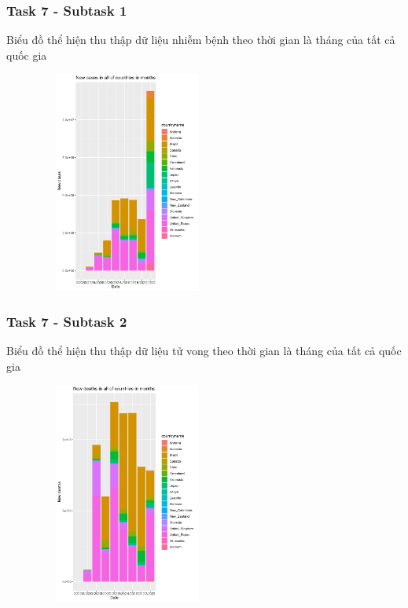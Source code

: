 \documentclass[english,10pt,table]{beamer}
\begin{document}
\frame
{
    \frametitle{Task 7 - Subtask 1}
    \begin{block}{Biểu đồ thể hiện thu thập dữ liệu nhiễm bệnh theo thời gian là tháng của tất cả quốc gia}
	\begin{figure}[H]
		\centering
		\includegraphics[height=7.3cm,width=6cm]{images/7.1.png}
	\end{figure}
    \end{block}
}
\frame
{
    \frametitle{Task 7 - Subtask 2}
    \begin{block}{Biểu đồ thể hiện thu thập dữ liệu tử vong theo thời gian là tháng của tất cả quốc gia}
	\begin{figure}[H]
		\centering
		\includegraphics[height=7.3cm,width=6cm]{images/7.2.png}
	\end{figure}
    \end{block}
}
\frame
\end{document}
